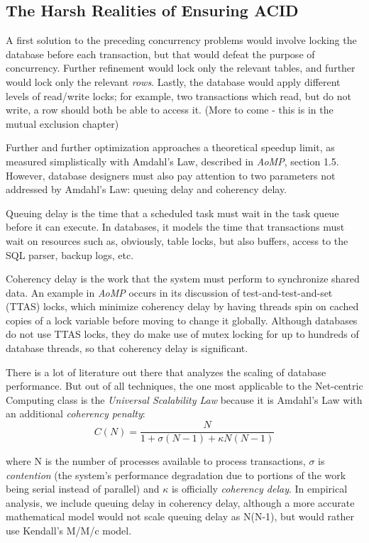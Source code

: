 \documentclass[12pt]{article} %
\begin{document}
\subsection{The Harsh Realities of Ensuring ACID}
A first solution to the preceding concurrency problems would involve locking the database before each transaction, but that would defeat the purpose of concurrency. Further refinement would lock only the relevant tables, and further would lock only the relevant \textit{rows}. Lastly, the database would apply different levels of read/write locks; for example, two transactions which read, but do not write, a row should both be able to access it. (More to come - this is in the mutual exclusion chapter)

Further and further optimization approaches a theoretical speedup limit, as measured simplistically with Amdahl's Law, described in \textit{AoMP}, section 1.5. However, database designers must also pay attention to two parameters not addressed by Amdahl's Law: queuing delay and coherency delay.

Queuing delay is the time that a scheduled task must wait in the task queue before it can execute. In databases, it models the time that transactions must wait on resources such as, obviously, table locks, but also buffers, access to the SQL parser, backup logs, etc.

Coherency delay is the work that the system must perform to synchronize shared data. An example in \textit{AoMP} occurs in its discussion of test-and-test-and-set (TTAS) locks, which minimize coherency delay by having threads spin on cached copies of a lock variable before moving to change it globally. Although databases do not use TTAS locks, they do make use of mutex locking for up to hundreds of database threads, so that coherency delay is significant.

There is a lot of literature out there that analyzes the scaling of database performance. But out of all techniques, the one most applicable to the Net-centric Computing class is the \textit{Universal Scalability Law} because it is Amdahl's Law with an additional \textit{coherency penalty}: 
\[C(N) = \frac{N}{1+\sigma (N-1)+\kappa N(N-1)}\] 

where N is the number of processes available to process transactions, \(\sigma\) is \textit{contention} (the system's performance degradation due to portions of the work being serial instead of parallel) and \(\kappa\) is officially \textit{coherency delay}. In empirical analysis, we include queuing delay in coherency delay, although a more accurate mathematical model would not scale queuing delay as N(N-1), but would rather use Kendall's M/M/c model.
\end{document}
